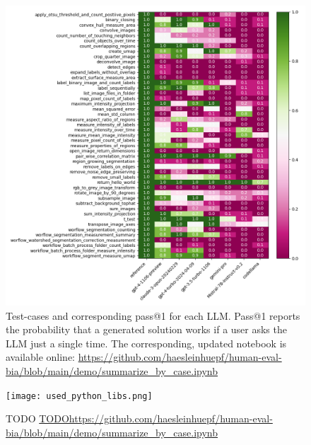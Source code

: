 \documentclass{ecai}
\begin{document}
\begin{figure}[h]
\centering
\includegraphics[width=\textwidth]{performance_per_task.png}
\caption{Test-cases  and corresponding pass@1 for each LLM. Pass@1 reports the probability that a generated solution works if a user asks the LLM just a single time. The corresponding, updated notebook is available online:
\url{https://github.com/haesleinhuepf/human-eval-bia/blob/main/demo/summarize_by_case.ipynb}
\newline
\newline
}
\label{fig:performancepertask}
\end{figure}

\begin{figure}[h]
\centering
\texttt{[image: used\_python\_libs.png]}
\caption{TODO
\url{TODOhttps://github.com/haesleinhuepf/human-eval-bia/blob/main/demo/summarize_by_case.ipynb}
\newline
\newline
}
\label{fig:usedpythonlibs}
\end{figure}

% 
\end{document}
